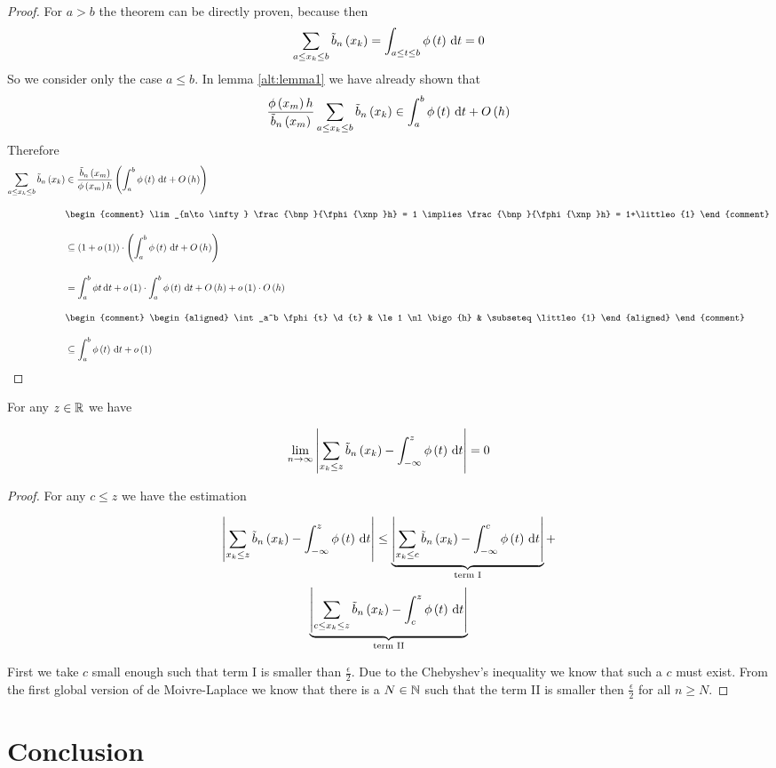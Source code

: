 \begin{proof}
  For $a > b$ the theorem can be directly proven, because then
  \begin{align}
    \sum_{a \le x_{k} \le b} \tilde b_{n}\left({x_{k}}\right) = \int_{a \le t \le b} \phi\left( {t} \right) \,\mathrm d{t} = 0
  \end{align}
  So we consider only the case $a\le b$. In lemma \ref{alt:lemma1} we have already shown that
  \begin{align}
    \frac{\phi\left( {x_{m}} \right)h}{\tilde b_{n}\left({x_{m}}\right)} \sum_{a\le x_{k} \le b} \tilde b_{n}\left({x_{k}}\right) \in \int_a^b \phi\left( {t} \right) \,\mathrm d{t} + O\left( {h} \right)
  \end{align}
  Therefore
  \begin{align}
    \sum_{a\le \x \le b} \bb{\x} & \in \frac{\bnp}{\fphi{\xnp}h} \br{\int_a^b \fphi{t} \d{t} + \bigo{h}} \bnl
    &
    \begin{comment}
      \lim_{n\to\infty} \frac{\bnp}{\fphi{\xnp}h} = 1 \implies \frac{\bnp}{\fphi{\xnp}h} = 1+\littleo{1}
    \end{comment} \bnl
    & \subseteq \br{1+\littleo{1}}\cdot \br{\int_a^b \fphi{t} \d{t} + \bigo{h}} \bnl
    & = \int_a^b \phi{t}\d{t} + \littleo{1} \cdot \int_a^b \fphi{t} \d{t} + \bigo{h} + \littleo{1} \cdot \bigo{h} \bnl
    &
    \begin{comment}
      \begin{aligned}
        \int_a^b \fphi{t} \d{t} & \le 1 \nl
        \bigo{h} & \subseteq \littleo{1}
      \end{aligned}
    \end{comment} \bnl
    & \subseteq \int_a^b \fphi{t} \d{t} + \littleo{1}
  \end{align}
\end{proof}

\begin{theorem}
  For any $z\in\mathbb R$ we have

  \begin{align}
    \lim_{n\to\infty} \left|{\sum_{x_{k} \le z} \tilde b_{n}\left({x_{k}}\right) - \int_{-\infty}^z \phi\left( {t} \right)\,\mathrm d{t} }\right| = 0
  \end{align}
\end{theorem}

\begin{proof}
  For any $c \le z$ we have the estimation

  \begin{multline}
    \abs{\sum_{\x \le z} \bb{\x} - \int_{-\infty}^z \fphi{t}\d{t} } \le
    \underbrace{\abs{\sum_{\x \le c} \bb{\x} - \int_{-\infty}^c \fphi{t}\d{t} }}_\text{term I} + \nl \underbrace{\abs{\sum_{c\le \x \le z} \bb{\x} - \int_c^z \fphi{t}\d{t} }}_\text{term II}
  \end{multline}

  First we take $c$ small enough such that term I is smaller than $\frac \epsilon 2$. Due to the Chebyshev's inequality \cite{wiki:chebyshev} we know that such a $c$ must exist. From the first global version of de Moivre-Laplace we know that there is a $N \in\mathbb N$ such that the term II is smaller then $\frac \epsilon 2$ for all $n\ge N$.
\end{proof}

\section{Conclusion}
